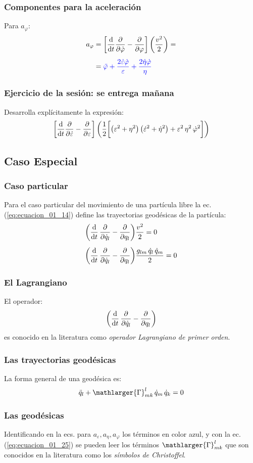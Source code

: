 \documentclass[12pt]{beamer}
\begin{document}
\begin{frame}
\frametitle{Componentes para la aceleración}
Para $a_{\varphi}$:
\pause
\begin{align*}
a_{\varphi} &= \bigg[ \dv{t} \pdv{\dot{\varphi}} - \pdv{\varphi} \bigg] \left( \dfrac{v^{2}}{2} \right) = \\[0.5em]
&=  \textcolor{blue}{\ddot{\varphi} + \dfrac{2 \dot{\varepsilon} \dot{\varphi}}{\varepsilon} + \dfrac{2 \dot{\eta} \dot{\varphi}}{\eta}}
\end{align*}
\end{frame}
\begin{frame}
\frametitle{\textbf{Ejercicio de la sesión: se entrega mañana}}
Desarrolla explícitamente la expresión:
\begin{align*}
\bigg[ \dv{t} \pdv{\dot{\varepsilon}} - \pdv{\varepsilon} \bigg] \left( \dfrac{1}{2} \bigg[ \big( \varepsilon^{2} + \eta^{2} \big) \, \big( \dot{\varepsilon}^{2} + \dot{\eta}^{2} \big) + \varepsilon^{2} \, \eta^{2} \, \dot{\varphi}^{2} \bigg] \right)
\end{align*}
\end{frame}

\subsection*{Caso Especial}

\begin{frame}
\frametitle{Caso particular}
Para el caso particular del movimiento de una partícula libre la ec. (\ref{eq:ecuacion_01_14}) define las trayectorias geodésicas de la partícula:
\begin{align*}
\left( \dv{t} \, \pdv{\dot{q}_{l}} - \pdv{q_{l}} \right) &\dfrac{v^{2}}{2} = 0 \\[0.5em] 
\left( \dv{t} \, \pdv{\dot{q}_{l}} - \pdv{q_{l}} \right) &\dfrac{g_{lm} \, \dot{q}_{l} \, \dot{q}_{m}}{2} = 0
\end{align*}
\end{frame}
\begin{frame}
\frametitle{El Lagrangiano}  
El operador:
\begin{align*}
\left( \dv{t} \, \pdv{\dot{q}_{l}} - \pdv{q_{l}} \right)
\end{align*}
es conocido en la literatura como \emph{operador Lagrangiano de primer orden}.
\end{frame}
\begin{frame}
\frametitle{Las trayectorias geodésicas}
La forma general de una geodésica es:
\pause
\begin{align}
\ddot{q}_{l} + \mathlarger{\Gamma}_{mk}^{l} \, \dot{q}_{m} \, \dot{q}_{k} = 0
\label{eq:ecuacion_01_25}
\end{align}
\end{frame}
\begin{frame}
\frametitle{Las geodésicas}
Identificando en la ecs. para $a_{\varepsilon}, a_{\eta}, a_{\varphi}$ los términos en color azul, y con la ec. (\ref{eq:ecuacion_01_25}) se pueden leer los términos $\mathlarger{\Gamma}_{mk}^{l}$ que son conocidos en la literatura como los \emph{símbolos de Christoffel}.
\end{frame}
\end{document}
